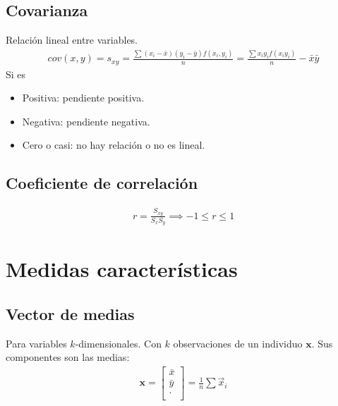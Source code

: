 \documentclass{article}
\begin{document}
\subsection{Covarianza}
Relación lineal entre variables.
\begin{equation}
    \begin{split}
        cov(x,y)=s_{xy}= \frac{\sum (x_{i}-\bar{x})(y_{i}-\bar{y})f(x_{i},y_{i})}{n}
        = \frac{\sum x_{i}y_{i}f(x_{i}y_{i})}{n} - \bar{x} \bar{y}
    \end{split}
\end{equation}
Si es
\begin{itemize}
    \item Positiva: pendiente positiva.
    \item Negativa: pendiente negativa.
    \item Cero o casi: no hay relación o no es lineal.
\end{itemize}
\subsection{Coeficiente de correlación}
\begin{equation}
    \begin{split}
        r = \frac{S_{xy}}{S_{x}S_{y}} \implies -1 \leq r \leq 1
    \end{split}
\end{equation}
\section{Medidas características}
\subsection{Vector de medias}
Para variables $k$-dimensionales.
Con $k$ observaciones de un individuo $\mathbf{x}$. Sus componentes son las medias:
\begin{equation}
    \begin{split}
        \mathbf{x}= \begin{bmatrix}
        \bar{x}\\
        \bar{y}\\
        .\\
        \end{bmatrix}= \frac{1}{n} \sum \vec{x}_{i}
    \end{split}
\end{equation}
\end{document}
